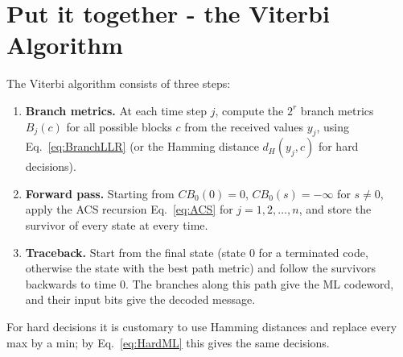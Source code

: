 \section{Put it together - the Viterbi Algorithm}\label{sec:viterbi}
The Viterbi algorithm consists of three steps:
\begin{enumerate}
    \item \textbf{Branch metrics.} At each time step \(j\), compute the \(2^r\) branch metrics \(B_j(c)\) for all possible blocks \(c\) from the received values \(y_j\), using Eq.~\ref{eq:BranchLLR} (or the Hamming distance \(d_H(y_j, c)\) for hard decisions).
    \item \textbf{Forward pass.} Starting from \(CB_0(0) = 0\), \(CB_0(s) = -\infty\) for \(s \neq 0\), apply the ACS recursion Eq.~\ref{eq:ACS} for \(j = 1, 2, \ldots, n\), and store the survivor of every state at every time.
    \item \textbf{Traceback.} Start from the final state (state \(0\) for a terminated code, otherwise the state with the best path metric) and follow the survivors backwards to time \(0\). The branches along this path give the ML codeword, and their input bits give the decoded message.
\end{enumerate}
For hard decisions it is customary to use Hamming distances and replace every max by a min; by Eq.~\ref{eq:HardML} this gives the same decisions.

